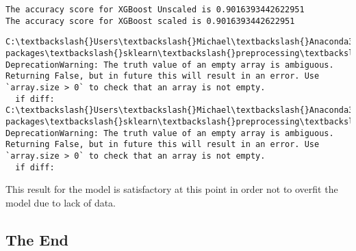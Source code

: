 \documentclass[11pt]{article}
\begin{document}
    \begin{Verbatim}[commandchars=\\\{\}]
The accuracy score for XGBoost Unscaled is 0.9016393442622951
The accuracy score for XGBoost scaled is 0.9016393442622951

    \end{Verbatim}

    \begin{Verbatim}[commandchars=\\\{\}]
C:\textbackslash{}Users\textbackslash{}Michael\textbackslash{}Anaconda3.2\textbackslash{}lib\textbackslash{}site-packages\textbackslash{}sklearn\textbackslash{}preprocessing\textbackslash{}label.py:151: DeprecationWarning: The truth value of an empty array is ambiguous. Returning False, but in future this will result in an error. Use `array.size > 0` to check that an array is not empty.
  if diff:
C:\textbackslash{}Users\textbackslash{}Michael\textbackslash{}Anaconda3.2\textbackslash{}lib\textbackslash{}site-packages\textbackslash{}sklearn\textbackslash{}preprocessing\textbackslash{}label.py:151: DeprecationWarning: The truth value of an empty array is ambiguous. Returning False, but in future this will result in an error. Use `array.size > 0` to check that an array is not empty.
  if diff:

    \end{Verbatim}

    This result for the model is satisfactory at this point in order not to
overfit the model due to lack of data.

    \subsection{The End}\label{the-end}


    
    
    
    
\end{document}

